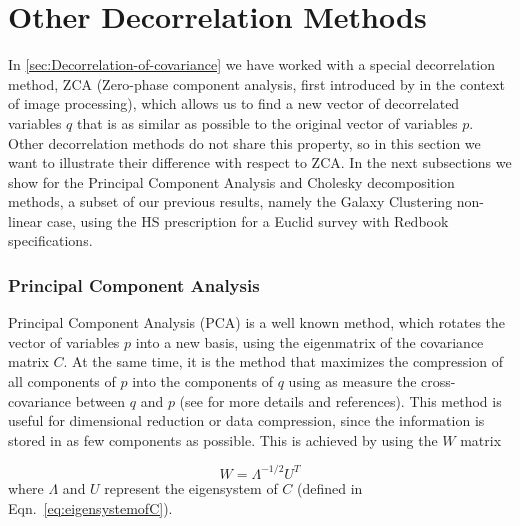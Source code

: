 \section{Other Decorrelation Methods}\label{sec:appdec}

In \cref{sec:Decorrelation-of-covariance} we have worked with a special decorrelation method, ZCA (Zero-phase component analysis, first 
introduced by \cite{Bell19973327} in the context of image processing), which
allows us to find a new vector of decorrelated variables $q$ that is as similar as possible to the original
vector of variables $p$.
Other decorrelation methods do not share this property,
so in this section we want to illustrate their difference 
with respect to ZCA.
In the next subsections we show for the Principal Component Analysis and Cholesky decomposition methods, 
a subset of our previous results, namely the Galaxy Clustering non-linear case, 
using the HS prescription for a Euclid survey with Redbook specifications.

\subsubsection{Principal Component Analysis }

Principal Component Analysis (PCA) \cite{Friedman-PCA} is a well known method, which rotates
the vector of variables $p$ into a new basis, using the eigenmatrix of the 
covariance matrix $C$. At the same time, it is the method that maximizes the compression of all components
of $p$ into the components of $q$ using as measure the cross-covariance
between $q$ and $p$ (see \cite{kessy_optimal_2015} for more details and references).
This method is useful for dimensional reduction or data compression, 
since the information is stored in as few components as possible.
This is achieved by using the $W$ matrix

\begin{equation}
W=\Lambda^{-1/2}U^{T}
\end{equation}
where $\Lambda$ and $U$ represent the eigensystem of $C$ (defined in Eqn.\ \ref{eq:eigensystemofC}).


